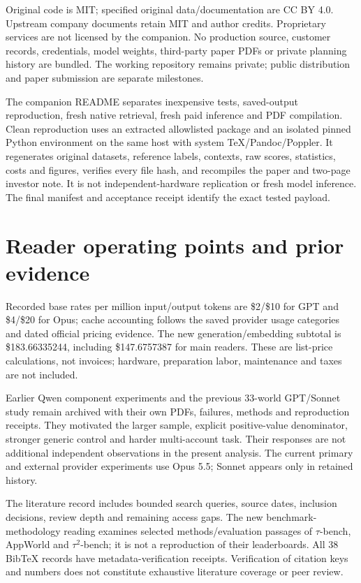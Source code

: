 Original code is MIT; specified original data/documentation are CC BY 4.0. Upstream company documents retain MIT and author credits. Proprietary services are not licensed by the companion. No production source, customer records, credentials, model weights, third-party paper PDFs or private planning history are bundled. The working repository remains private; public distribution and paper submission are separate milestones.

The companion README separates inexpensive tests, saved-output reproduction, fresh native retrieval, fresh paid inference and PDF compilation. Clean reproduction uses an extracted allowlisted package and an isolated pinned Python environment on the same host with system TeX/Pandoc/Poppler. It regenerates original datasets, reference labels, contexts, raw scores, statistics, costs and figures, verifies every file hash, and recompiles the paper and two-page investor note. It is not independent-hardware replication or fresh model inference. The final manifest and acceptance receipt identify the exact tested payload.

\section{Reader operating points and prior evidence}
\begin{table}[ht]
\centering\footnotesize
\caption{Means across 360 main calls per treatment. Input/output are provider-reported tokens; elapsed seconds are observed response durations in the concurrent batch, not summed CPU time or service-level guarantees. USD includes recorded cache rates. Full context has a larger input footprint by design.}
\label{tab:resources}
\end{table}

Recorded base rates per million input/output tokens are \$2/\$10 for GPT and \$4/\$20 for Opus; cache accounting follows the saved provider usage categories and dated official pricing evidence. The new generation/embedding subtotal is \$183.66335244, including \$147.6757387 for main readers. These are list-price calculations, not invoices; hardware, preparation labor, maintenance and taxes are not included.

Earlier Qwen component experiments and the previous 33-world GPT/Sonnet study remain archived with their own PDFs, failures, methods and reproduction receipts. They motivated the larger sample, explicit positive-value denominator, stronger generic control and harder multi-account task. Their responses are not additional independent observations in the present analysis. The current primary and external provider experiments use Opus 5.5; Sonnet appears only in retained history.

The literature record includes bounded search queries, source dates, inclusion decisions, review depth and remaining access gaps. The new benchmark-methodology reading examines selected methods/evaluation passages of $\tau$-bench, AppWorld and $\tau^2$-bench; it is not a reproduction of their leaderboards. All 38 BibTeX records have metadata-verification receipts. Verification of citation keys and numbers does not constitute exhaustive literature coverage or peer review.
